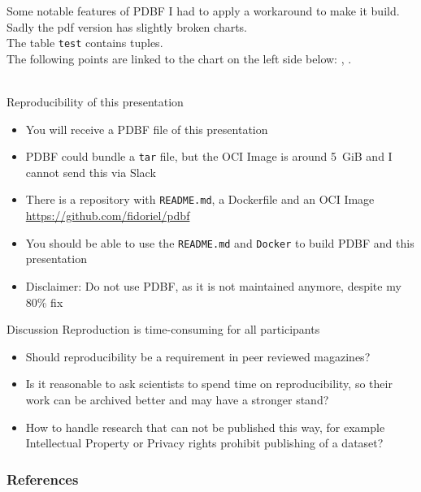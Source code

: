 \documentclass[aspectratio=169]{beamer}
\begin{document}
\begin{frame}{Some notable features of PDBF}
    I had to apply a workaround to make it build. Sadly the pdf version has slightly broken charts.
    \\[3pt]
    The table \texttt{test} contains  tuples.\\[3pt]

    The following points are linked to the chart on the left side below: , .\\[3pt]
    \\[1pt]
\end{frame}


\begin{frame}{Reproducibility of this presentation}
    \begin{itemize}
    \item You will receive a PDBF file of this presentation
    \item PDBF could bundle a \texttt{tar} file, but the OCI Image is around 5~GiB and I cannot send this via Slack
    \item There is a repository with \texttt{README.md}, a Dockerfile and an OCI Image \url{https://github.com/fidoriel/pdbf}
    \item You should be able to use the \texttt{README.md} and \texttt{Docker} to build PDBF and this presentation
    \item Disclaimer: Do not use PDBF, as it is not maintained anymore, despite my 80\% fix
    \end{itemize}
\end{frame}


\begin{frame}{Discussion}
    Reproduction is time-consuming for all participants
    \begin{itemize}
    \item Should reproducibility be a requirement in peer reviewed magazines?
    \item Is it reasonable to ask scientists to spend time on reproducibility, so their work can be archived better and may have a stronger stand?
    \item How to handle research that can not be published this way, for example Intellectual Property or Privacy rights prohibit publishing of a dataset?
    \end{itemize}
\end{frame}

\begin{frame}[allowframebreaks]

\frametitle{References}
\printbibliography

\end{frame}
\end{document}
